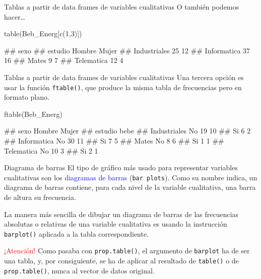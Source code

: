 \documentclass[
  ignorenonframetext,
  aspectratio=169]{beamer}
\newenvironment{Shaded}{\begin{snugshade}}{\end{snugshade}}
\newcommand{\DecValTok}[1]{\textcolor[rgb]{0.00,0.00,0.81}{#1}}
\newcommand{\FunctionTok}[1]{\textcolor[rgb]{0.00,0.00,0.00}{#1}}
\newcommand{\NormalTok}[1]{#1}
\let\oldverbatim\verbatim
\let\endoldverbatim\endverbatim
\renewenvironment{verbatim}{\tiny\oldverbatim}{\endoldverbatim}
\newcommand\blue[1]{\textcolor{blue}{#1}}
\newcommand\red[1]{\textcolor{red}{#1}}
\begin{document}
\begin{frame}[fragile]{Tablas a partir de data frames de variables
cualitativas}
\protect\hypertarget{tablas-a-partir-de-data-frames-de-variables-cualitativas-8}{}
O también podemos hacer\ldots{}

\begin{Shaded}
\begin{Highlighting}[]
\FunctionTok{table}\NormalTok{(Beb\_Energ[}\FunctionTok{c}\NormalTok{(}\DecValTok{1}\NormalTok{,}\DecValTok{3}\NormalTok{)])}
\end{Highlighting}
\end{Shaded}

\begin{verbatim}
##               sexo
## estudio        Hombre Mujer
##   Industriales     25    12
##   Informatica      37    16
##   Mates             9     7
##   Telematica       12     4
\end{verbatim}
\end{frame}

\begin{frame}[fragile]{Tablas a partir de data frames de variables
cualitativas}
\protect\hypertarget{tablas-a-partir-de-data-frames-de-variables-cualitativas-9}{}
Una tercera opción es usar la función \texttt{ftable()}, que produce la
misma tabla de frecuencias pero en formato plano.

\begin{Shaded}
\begin{Highlighting}[]
\FunctionTok{ftable}\NormalTok{(Beb\_Energ)}
\end{Highlighting}
\end{Shaded}

\begin{verbatim}
##                   sexo Hombre Mujer
## estudio      bebe                  
## Industriales No            19    10
##              Si             6     2
## Informatica  No            30    11
##              Si             7     5
## Mates        No             8     6
##              Si             1     1
## Telematica   No            10     3
##              Si             2     1
\end{verbatim}
\end{frame}

\begin{frame}[fragile]{Diagrama de barras}
\protect\hypertarget{diagrama-de-barras}{}
El tipo de gráfico más usado para representar variables cualitativas son
los \blue{diagramas de barras} (\texttt{bar\ plots}). Como su nombre
indica, un diagrama de barras contiene, para cada nivel de la variable
cualitativa, una barra de altura su frecuencia.

La manera más sencilla de dibujar un diagrama de barras de las
frecuencias absolutas o relativas de una variable cualitativa es usando
la instrucción \texttt{barplot()} aplicada a la tabla correspondiente.

\red{¡Atención!} Como pasaba con \texttt{prop.table()}, el argumento de
\texttt{barplot} ha de ser una tabla, y, por consiguiente, se ha de
aplicar al resultado de \texttt{table()} o de \texttt{prop.table()},
nunca al vector de datos original.
\end{frame}
\end{document}
